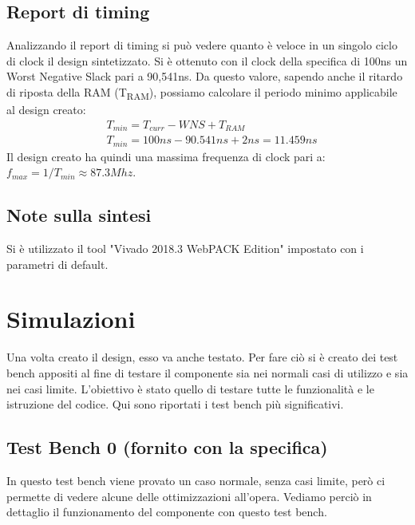 \documentclass{article}
\begin{document}
\subsection{Report di timing}
Analizzando il report di timing si può vedere quanto è veloce in un singolo ciclo di clock il design sintetizzato. Si è ottenuto con il clock della specifica di 100ns un Worst Negative Slack pari a 90,541ns. Da questo valore, sapendo anche il ritardo di riposta della RAM (T\textsubscript{RAM}), possiamo calcolare il periodo minimo applicabile al design creato:
\begin{align*}
    &T_{min} = T_{curr} - \mathit{WNS} + T_{RAM} \\
    &T_{min} = 100ns - 90.541ns + 2ns = 11.459ns
\end{align*}
Il design creato ha quindi una massima frequenza di clock pari a: \( f_{max} = 1/T_{min} \approx 87.3 \mathit{Mhz} \).

\subsection{Note sulla sintesi}
Si è utilizzato il tool "Vivado 2018.3 WebPACK Edition" impostato con i parametri di default.


\pagebreak
\section{Simulazioni}
Una volta creato il design, esso va anche testato. Per fare ciò si è creato dei test bench appositi al fine di testare il componente sia nei normali casi di utilizzo e sia nei casi limite. L'obiettivo è stato quello di testare tutte le funzionalità e le istruzione del codice. Qui sono riportati i test bench più significativi.

\subsection{Test Bench 0 (fornito con la specifica)}
In questo test bench viene provato un caso normale, senza casi limite, però ci permette di vedere alcune delle ottimizzazioni all'opera. Vediamo perciò in dettaglio il funzionamento del componente con questo test bench.
\end{document}
